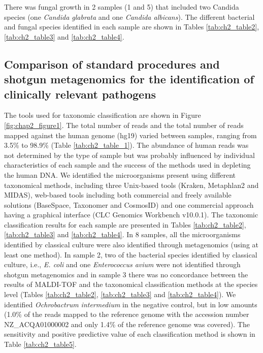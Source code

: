 There was fungal growth in 2 samples (1 and 5) that included two Candida species (one \textit{Candida glabrata} and one \textit{Candida albicans}). 
The different bacterial and fungal species identified in each sample are shown in Tables \ref{tab:ch2_table2}, \ref{tab:ch2_table3} and \ref{tab:ch2_table4}.

\begin{landscape}

\end{landscape}

\begin{landscape}

\end{landscape}

\begin{landscape}

\end{landscape}

\subsection{Comparison of standard procedures and shotgun metagenomics for the identification of clinically relevant pathogens}

The tools used for taxonomic classification are shown in Figure \ref{fig:chap2_figure1}. 
The total number of reads and the total number of reads mapped against the human genome (hg19) varied between samples, ranging from 3.5\% to 98.9\% (Table \ref{tab:ch2_table_1}). 
The abundance of human reads was not determined by the type of sample but was probably influenced by individual characteristics of each sample and the success of the methods used in depleting the human DNA. 
We identified the microorganisms present using different taxonomical methods, including three Unix-based tools (Kraken, Metaphlan2 and MIDAS), web-based tools including both commercial and freely available solutions (BaseSpace, Taxonomer and CosmosID) and one commercial approach having a graphical interface (CLC Genomics Workbench v10.0.1). 
The taxonomic classification results for each sample are presented in Tables \ref{tab:ch2_table2}, \ref{tab:ch2_table3} and \ref{tab:ch2_table4}. 
In 8 samples, all the microorganisms identified by classical culture were also identified through metagenomics (using at least one method). 
In sample 2, two of the bacterial species identified by classical culture, i.e., \textit{E. coli} and one \textit{Enterococcus avium} were not identified through shotgun metagenomics and in sample 3 there was no concordance between the results of MALDI-TOF and the taxonomical classification methods at the species level (Tables \ref{tab:ch2_table2}, \ref{tab:ch2_table3} and \ref{tab:ch2_table4}).
We identified \textit{Ochrobactrum intermedium} in the negative control, but in low amounts (1.0\% of the reads mapped to the reference genome with the accession number NZ\_ACQA01000002 and only 1.4\% of the reference genome was covered). 
The sensitivity and positive predictive value of each classification method is shown in Table \ref{tab:ch2_table5}.

